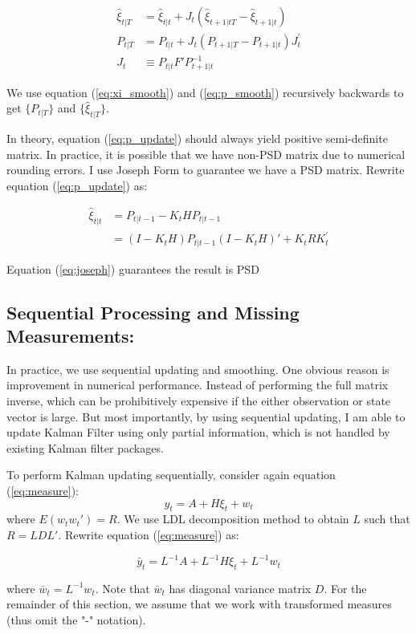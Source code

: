 \documentclass[12pt]{article}
\numberwithin{equation}{section}
\begin{document}
\begin{align}
    \hat{\xi}_{t|T} & = \hat{\xi}_{t|t} + J_t(\hat{\xi}_{t+1|tT} - \hat{\xi}_{t+1|t}) \label{eq:xi_smooth} \\
    P_{t|T} & = P_{t|t} + J_{t}(P_{t+1|T} - P_{t+1|t})J_{t}^{'} \label{eq:p_smooth} \\
    J_t & \equiv P_{t|t}F'P_{t+1|t}^{-1} \label{eq:back_smooth}
\end{align}

We use equation (\ref{eq:xi_smooth}) and (\ref{eq:p_smooth}) recursively backwards to get $\{P_{t|T}\}$ and $\{\hat{\xi}_{t|T}\}$. 

In theory, equation (\ref{eq:p_update}) should always yield positive semi-definite matrix. In practice, it is possible that we have non-PSD matrix due to numerical rounding errors. I use Joseph Form to guarantee we have a PSD matrix. Rewrite equation (\ref{eq:p_update}) as:

\begin{align} 
    \hat{\xi}_{t|t} & = P_{t|t-1} - K_tHP_{t|t-1} \nonumber \\
    & = (I-K_tH)P_{t|t-1}(I-K_tH)'+K_tRK_t^{'} \label{eq:joseph}
\end{align}

Equation (\ref{eq:joseph}) guarantees the result is PSD 

\subsection{Sequential Processing and Missing Measurements:} \label{subsec:seq}

In practice, we use sequential updating and smoothing. One obvious reason is improvement in numerical performance. Instead of performing the full matrix inverse, which can be prohibitively expensive if the either observation or state vector is large. But most importantly, by using sequential updating, I am able to update Kalman Filter using only partial information, which is not handled by existing Kalman filter packages. 

To perform Kalman updating sequentially, consider again equation (\ref{eq:measure}):
\[
    y_t = A + H\xi_{t} + w_t 
\]
where $E(w_{t}w_{t}')=R$. We use LDL decomposition method to obtain $L$ such that $R=LDL'$. Rewrite equation (\ref{eq:measure}) as:

\[
    \bar{y}_t = L^{-1}A + L^{-1}H\xi_{t} + L^{-1}w_t
\]

where $\bar{w}_t = L^{-1}w_t$. Note that $\bar{w}_t$ has diagonal variance matrix $D$. For the remainder of this section, we assume that we work with transformed measures (thus omit the "-" notation).
\end{document}
